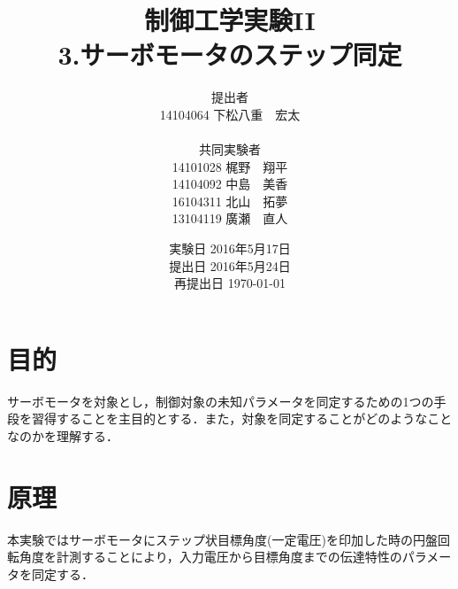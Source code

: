 \documentclass[11pt,a4paper]{jsarticle}
\begin{document}
\title{制御工学実験II \\ 3.サーボモータのステップ同定}
\author{提出者 \\ 14104064 下松八重　宏太 \\ \\ 共同実験者 \\ 14101028 梶野　翔平 \\ 14104092 中島　美香 \\ 16104311 北山　拓夢 \\ 13104119 廣瀬　直人}
\date{実験日 2016年5月17日 \\ 提出日 2016年5月24日 \\ 再提出日 \today}



\maketitle
\thispagestyle{empty}
\newpage


\section{目的}
サーボモータを対象とし，制御対象の未知パラメータを同定するための1つの手段を習得することを主目的とする．また，対象を同定することがどのようなことなのかを理解する．

\section{原理}
本実験ではサーボモータにステップ状目標角度(一定電圧)を印加した時の円盤回転角度を計測することにより，入力電圧から目標角度までの伝達特性のパラメータを同定する．
\end{document}
